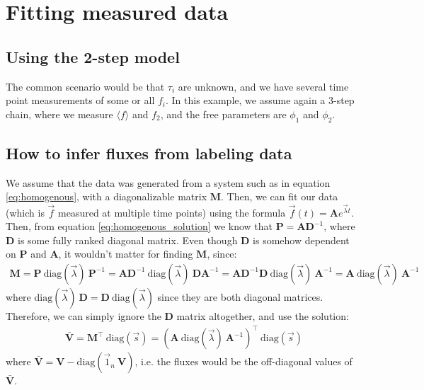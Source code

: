 \documentclass{article}
\newcommand{\fin}{\ensuremath{\langle f \rangle}}
\begin{document}
\clearpage
\section{Fitting measured data}

\subsection{Using the 2-step model}
The common scenario would be that $\tau_i$ are unknown, and we have several time point measurements of some or all $f_i$. In this example, we assume again a 3-step chain, where we measure $\fin$ and $f_2$, and the free parameters are $\phi_1$ and $\phi_2$. 

\subsection{How to infer fluxes from labeling data}

We assume that the data was generated from a system such as in equation \ref{eq:homogenous}, with a diagonalizable matrix $\mathbf{M}$. Then, we can fit our data (which is $\vec{f}$ measured at multiple time points) using the formula $\vec{f}(t) = \mathbf{A} e^{\vec{\lambda} t}$. Then, from equation \ref{eq:homogenous_solution} we know that $\mathbf{P} = \mathbf{A} \mathbf{D}^{-1}$, where $\mathbf{D}$ is some fully ranked diagonal matrix. Even though $\mathbf{D}$ is somehow dependent on $\mathbf{P}$ and $\mathbf{A}$, it wouldn't matter for finding $\mathbf{M}$, since:
\begin{eqnarray}
    \mathbf{M} = \mathbf{P}~\text{diag}(\vec{\lambda})~\mathbf{P}^{-1} = \mathbf{A}\mathbf{D}^{-1}~\text{diag}(\vec{\lambda})~\mathbf{D}\mathbf{A}^{-1} = 
    \mathbf{A}\mathbf{D}^{-1}\mathbf{D}~\text{diag}(\vec{\lambda})~\mathbf{A}^{-1} = 
    \mathbf{A}~\text{diag}(\vec{\lambda})~\mathbf{A}^{-1}
\end{eqnarray}
where $\text{diag}(\vec{\lambda})~\mathbf{D} = \mathbf{D}~\text{diag}(\vec{\lambda})$ since they are both diagonal matrices. Therefore, we can simply ignore the $\mathbf{D}$ matrix altogether, and use the solution:
\begin{eqnarray}
    \mathbf{\bar{V}} = \mathbf{M}^\top~\text{diag}(\vec{s}) = \left(\mathbf{A}~\text{diag}(\vec{\lambda})~\mathbf{A}^{-1} \right)^\top~\text{diag}(\vec{s})
\end{eqnarray}
where $\mathbf{\bar{V}} = \mathbf{V} - \text{diag}(\vec{1}_n~\mathbf{V})$, i.e. the fluxes would be the off-diagonal values of $\mathbf{\bar{V}}$.
\end{document}

